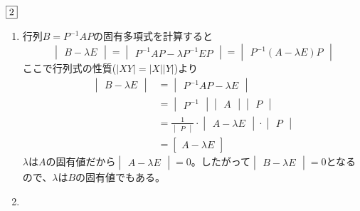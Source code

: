 \begin{souanswer} %
	$\fbox{2}$
\begin{enumerate}
	\item 行列$B= P^{-1}AP$の固有多項式を計算すると
\begin{equation*}
	\begin{vmatrix}B- \lambda E\end{vmatrix}= \begin{vmatrix}P^{-1}AP- \lambda P^{-1}EP\end{vmatrix}= \begin{vmatrix}P^{-1}(A- \lambda E)P\end{vmatrix}
\end{equation*}
	ここで行列式の性質($|XY|= |X||Y|$)より
\begin{align*}
	\begin{vmatrix}B- \lambda E\end{vmatrix}
	&= \begin{vmatrix}P^{-1}AP- \lambda E\end{vmatrix}\\
	&= \begin{vmatrix}P^{-1}\end{vmatrix}\begin{vmatrix}A\end{vmatrix}\begin{vmatrix}P\end{vmatrix}\\
	&= \frac{1}{\begin{vmatrix}P\end{vmatrix}}\cdot\begin{vmatrix}A- \lambda E\end{vmatrix}\cdot \begin{vmatrix}P\end{vmatrix}\\
	&= \begin{bmatrix}A- \lambda E\end{bmatrix}
\end{align*}
	$\lambda$は$A$の固有値だから$\begin{vmatrix}A- \lambda E\end{vmatrix}= 0$。したがって$\begin{vmatrix}B- \lambda E\end{vmatrix}= 0$となるので、$\lambda$は$B$の固有値でもある。
	\item 
{}
\end{enumerate}
\end{souanswer}
